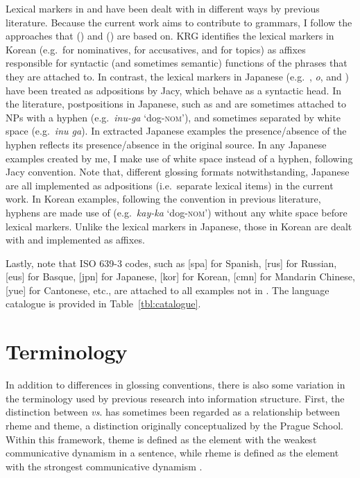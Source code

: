 Lexical markers in  and  have been dealt
with in different ways by previous literature. Because the current
work aims to contribute to  grammars, I follow the
approaches that  (\citealt{siegel:etal:16}) and 
(\citealt{kim:etal:11}) are based on.  KRG identifies the lexical
markers in Korean (e.g.\ \ika for nominatives, \lul for accusatives,
and \nun for topics) as affixes responsible for syntactic (and
sometimes semantic) functions of the phrases that they are attached
to. In contrast, the lexical markers in Japanese
(e.g.\ \ga, \textit{o}, and \wa) have been treated as adpositions by
Jacy, which behave as a syntactic head.  In the literature,
postpositions in Japanese, such as \ga and \wa are sometimes attached
to NPs with a hyphen (e.g.\ \textit{inu-ga} `dog-\textsc{nom}'), and
sometimes separated by white space (e.g.\ \textit{inu ga}).  In
extracted Japanese examples the presence/absence of the hyphen
reflects its presence/absence in the original source.  In any Japanese
examples created by me, I make use of white space instead of a hyphen,
following Jacy convention. Note that, different glossing formats
notwithstanding, Japanese  are all implemented as
adpositions (i.e.\ separate lexical items) in the current work.  In
Korean examples, following the convention in previous literature,
hyphens are made use of (e.g.\ \textit{kay-ka} `dog-\textsc{nom}')
without any white space before lexical markers. Unlike the lexical
markers in Japanese, those in Korean are dealt with and implemented as
affixes.



Lastly, note that ISO 639-3 codes, such as [spa] for Spanish, [rus]
for Russian, [eus] for Basque, [jpn] for Japanese, [kor] for Korean,
[cmn] for Mandarin Chinese, [yue] for Cantonese, etc., are attached to
all examples not in .  The language catalogue is provided
in Table~\ref{tbl:catalogue}.



\section{Terminology}
\label{1:sec:terminology}

In addition to differences in glossing conventions, there is also some
variation in the terminology used by previous research into
information structure. First, the distinction between 
\textit{vs}.  has sometimes been regarded as a relationship
between rheme and theme, a distinction originally conceptualized by
the Prague School.  Within this framework, theme is defined as the
element with the weakest communicative dynamism in a sentence, while
rheme is defined as the element with the strongest communicative
dynamism \citep[72]{firbas:92}.



